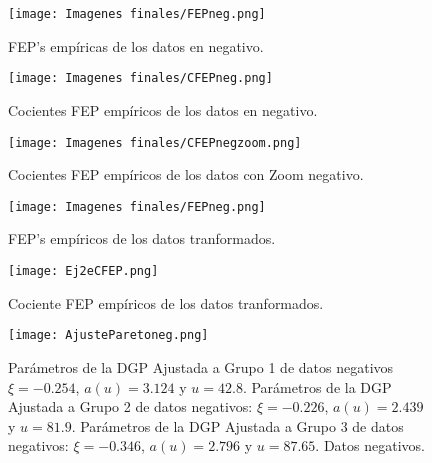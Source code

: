 \documentclass[10.5pt,notitlepage]{article}
\theoremstyle{plain}
\begin{document}
\begin{figure}[htb]
    \centering
    \texttt{[image: Imagenes finales/FEPneg.png]}
    \caption{FEP's empíricas de los datos en negativo.}
    \label{mEj2eFEP} 
\end{figure}
\begin{figure}[htb]
    \centering
    \texttt{[image: Imagenes finales/CFEPneg.png]}
    \caption{Cocientes FEP empíricos de los datos en negativo.}
    \label{mEj2eCFEP} 
\end{figure}
\begin{figure}[htb]
    \centering
    \texttt{[image: Imagenes finales/CFEPnegzoom.png]}
    \caption{Cocientes FEP empíricos de los datos con Zoom negativo.}
    \label{mEj2eCFEPZoom} 
\end{figure}
\begin{figure}[htb]
    \centering
    \texttt{[image: Imagenes finales/FEPneg.png]}
    \caption{FEP's empíricos de los datos tranformados.}
    \label{mEj2eFEPtrans} 
\end{figure}
\begin{figure}[htb]
    \centering
    \texttt{[image: Ej2eCFEP.png]}
    \caption{Cociente FEP empíricos de los datos tranformados.}
    \label{mEj2eCFEPtrans} 
\end{figure}
\begin{figure}[htb]
    \centering
    \texttt{[image: AjusteParetoneg.png]}
    \caption{Parámetros de la DGP Ajustada a Grupo 1 de datos negativos \(\xi =-0.254\), \(a(u)=3.124\) y \(u = 42.8\). Parámetros de la DGP Ajustada a Grupo 2 de datos negativos: \(\xi =-0.226\), \(a(u)=2.439\) y \(u = 81.9\).  Parámetros de la DGP Ajustada a Grupo 3 de datos negativos: \(\xi =-0.346\), \(a(u)=2.796  \) y \(u = 87.65\). Datos negativos.}
    \label{DGPneg} 
\end{figure}
\end{document}
